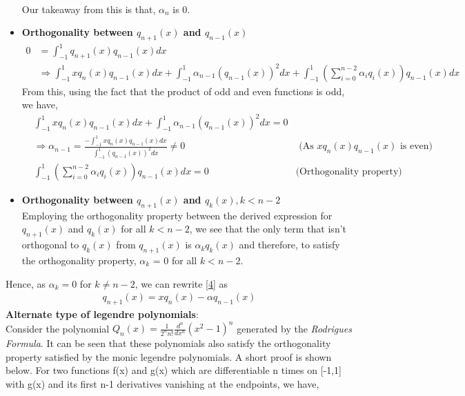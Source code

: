 \documentclass[letterpaper]{exam}
\begin{document}
\begin{questions}
\begin{parts}
\begin{solution}
\begin{itemize}
\begin{align*}
    \end{align*}
    Our takeaway from this is that, $\alpha_{n}$ is 0.
    \item \textbf{Orthogonality between $q_{n+1}(x)$ and $q_{n-1}(x)$}\\
    \begin{align*}
        0 &= \int_{-1}^{1} q_{n+1}(x)q_{n-1}(x)dx\\
        &\Rightarrow 
        \int_{-1}^{1} xq_{n}(x)q_{n-1}(x)dx + \int_{-1}^{1} \alpha_{n-1}\left(q_{n-1}(x)\right)^{2}dx + \int_{-1}^{1} \left(\sum_{i=0}^{n-2} \alpha_{i}q_i(x)\right)q_{n-1}(x)dx
    \end{align*}
    From this, using the fact that the product of odd and even functions is odd, we have,
    \begin{align*}
      &\int_{-1}^{1} xq_{n}(x)q_{n-1}(x)dx + \int_{-1}^{1} \alpha_{n-1}\left(q_{n-1}(x)\right)^{2}dx  = 0\\
      &\Rightarrow 
      \alpha_{n-1} = \frac{- \int_{-1}^{1} xq_{n}(x)q_{n-1}(x)dx}{\int_{-1}^{1} \left(q_{n-1}(x)\right)^{2}dx} \neq 0 &\mbox{ (As $xq_{n}(x)q_{n-1}(x)$ is even)}\\
      & \int_{-1}^{1} \left(\sum_{i=0}^{n-2} \alpha_{i}q_i(x)\right)q_{n-1}(x)dx = 0 &\mbox{(Orthogonality property)}
    \end{align*}
    \item \textbf{Orthogonality between $q_{n+1}(x)$ and $q_{k}(x), k < n-2$}\\
    Employing the orthogonality property between the derived expression for  $q_{n+1}(x)$ and $q_{k}(x)$ for all $k < n-2$, we see that the only term that isn't orthogonal to $q_{k}(x)$ from $q_{n+1}(x)$ is $\alpha_{k}q_{k}(x)$ and therefore, to satisfy the orthogonality property, $\alpha_{k}$ = 0 for all $k < n-2$.
\end{itemize}
Hence, as $\alpha_{k} = 0$ for $k \neq n-2$, we can rewrite \ref{4} as
\begin{align}\label{5}
    q_{n+1}(x) = xq_{n}(x) - \alpha q_{n-1}(x)
\end{align}
\textbf{Alternate type of legendre polynomials}:\\
Consider the polynomial $ Q_n(x) = \frac{1}{2^n n!}\frac{d^n }{dx^n}\left(x^2-1\right)^n$ generated by the \textit{Rodrigues Formula}. It can be seen that these polynomials also satisfy the orthogonality property satisfied by the monic legendre polynomials. A short proof is shown below.
For two functions f(x) and g(x) which are differentiable n times on [-1,1] with g(x) and its first n-1 derivatives vanishing at the endpoints, we have,

\end{solution}
\end{parts}
\end{questions}
\end{document}

